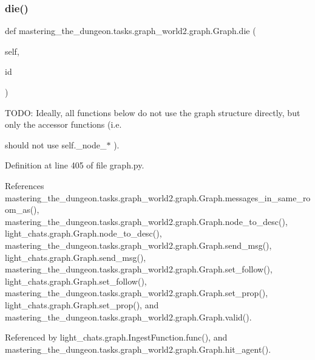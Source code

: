 \subsubsection{\texorpdfstring{die()}{die()}}
{\footnotesize\ttfamily def mastering\+\_\+the\+\_\+dungeon.\+tasks.\+graph\+\_\+world2.\+graph.\+Graph.\+die (\begin{DoxyParamCaption}\item[{}]{self,  }\item[{}]{id }\end{DoxyParamCaption})}





 T\+O\+DO\+: Ideally, all functions below do not use the graph structure directly, but only the accessor functions (i.\+e. 

should not use self.\+\_\+node\+\_\+$\ast$ ). 

Definition at line 405 of file graph.\+py.



References mastering\+\_\+the\+\_\+dungeon.\+tasks.\+graph\+\_\+world2.\+graph.\+Graph.\+messages\+\_\+in\+\_\+same\+\_\+room\+\_\+as(), mastering\+\_\+the\+\_\+dungeon.\+tasks.\+graph\+\_\+world2.\+graph.\+Graph.\+node\+\_\+to\+\_\+desc(), light\+\_\+chats.\+graph.\+Graph.\+node\+\_\+to\+\_\+desc(), mastering\+\_\+the\+\_\+dungeon.\+tasks.\+graph\+\_\+world2.\+graph.\+Graph.\+send\+\_\+msg(), light\+\_\+chats.\+graph.\+Graph.\+send\+\_\+msg(), mastering\+\_\+the\+\_\+dungeon.\+tasks.\+graph\+\_\+world2.\+graph.\+Graph.\+set\+\_\+follow(), light\+\_\+chats.\+graph.\+Graph.\+set\+\_\+follow(), mastering\+\_\+the\+\_\+dungeon.\+tasks.\+graph\+\_\+world2.\+graph.\+Graph.\+set\+\_\+prop(), light\+\_\+chats.\+graph.\+Graph.\+set\+\_\+prop(), and mastering\+\_\+the\+\_\+dungeon.\+tasks.\+graph\+\_\+world2.\+graph.\+Graph.\+valid().



Referenced by light\+\_\+chats.\+graph.\+Ingest\+Function.\+func(), and mastering\+\_\+the\+\_\+dungeon.\+tasks.\+graph\+\_\+world2.\+graph.\+Graph.\+hit\+\_\+agent().

